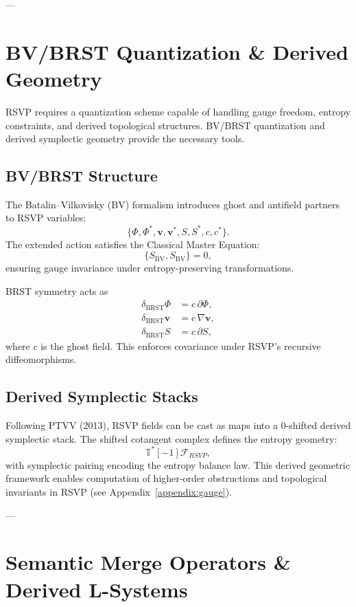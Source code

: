 \documentclass[12pt]{report}
\begin{document}
---

\chapter{BV/BRST Quantization \& Derived Geometry}

RSVP requires a quantization scheme capable of handling gauge freedom, entropy constraints, and derived topological structures. BV/BRST quantization and derived symplectic geometry provide the necessary tools.

\section{BV/BRST Structure}

The Batalin–Vilkovisky (BV) formalism introduces ghost and antifield partners to RSVP variables:
\[
\{\Phi, \Phi^*, \mathbf{v}, \mathbf{v}^*, S, S^*, c, c^*\}.
\]
The extended action satisfies the Classical Master Equation:
\begin{equation}
\{ S_{\text{BV}}, S_{\text{BV}} \} = 0,
\end{equation}
ensuring gauge invariance under entropy-preserving transformations.

BRST symmetry acts as
\begin{align}
\delta_{\text{BRST}} \Phi &= c \, \partial \Phi, \\
\delta_{\text{BRST}} \mathbf{v} &= c \, \nabla \mathbf{v}, \\
\delta_{\text{BRST}} S &= c \, \partial S,
\end{align}
where $c$ is the ghost field. This enforces covariance under RSVP’s recursive diffeomorphisms.

\section{Derived Symplectic Stacks}

Following PTVV (2013), RSVP fields can be cast as maps into a $0$-shifted derived symplectic stack. The shifted cotangent complex defines the entropy geometry:
\[
\mathbb{T}^*[-1]\mathcal{F}_{RSVP},
\]
with symplectic pairing encoding the entropy balance law.  
This derived geometric framework enables computation of higher-order obstructions and topological invariants in RSVP (see Appendix~\ref{appendix:gauge}).

---

\chapter{Semantic Merge Operators \& Derived L-Systems}
\end{document}
